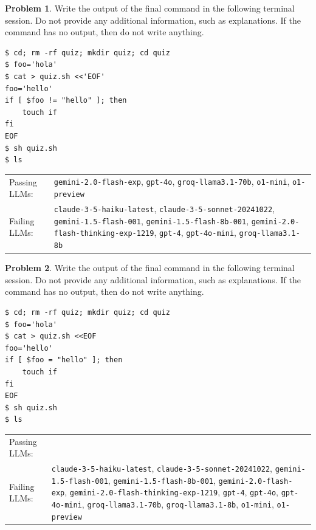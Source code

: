 \documentclass[10pt]{article}
\theoremstyle{definition}
\newtheorem{problem}{Problem}
\begin{document}
\noindent\vspace{0.1in}\begin{minipage}{\textwidth}

\begin{problem}
Write the output of the final command in the following terminal session.
Do not provide any additional information,
such as explanations.
If the command has no output,
then do not write anything.

\end{problem}
\begin{lstlisting}
$ cd; rm -rf quiz; mkdir quiz; cd quiz
$ foo='hola'
$ cat > quiz.sh <<'EOF'
foo='hello'
if [ $foo != "hello" ]; then
    touch if
fi
EOF
$ sh quiz.sh
$ ls
\end{lstlisting}


\noindent
\begin{tabular}{p{1.0in}L{5in}}
Passing LLMs: & {\lstinline$gemini-2.0-flash-exp$}, {\lstinline$gpt-4o$}, {\lstinline$groq-llama3.1-70b$}, {\lstinline$o1-mini$}, {\lstinline$o1-preview$} \\
Failing LLMs: & {\lstinline$claude-3-5-haiku-latest$}, {\lstinline$claude-3-5-sonnet-20241022$}, {\lstinline$gemini-1.5-flash-001$}, {\lstinline$gemini-1.5-flash-8b-001$}, {\lstinline$gemini-2.0-flash-thinking-exp-1219$}, {\lstinline$gpt-4$}, {\lstinline$gpt-4o-mini$}, {\lstinline$groq-llama3.1-8b$} \\
\end{tabular}

\end{minipage}
\noindent\vspace{0.1in}\begin{minipage}{\textwidth}

\begin{problem}
Write the output of the final command in the following terminal session.
Do not provide any additional information,
such as explanations.
If the command has no output,
then do not write anything.

\end{problem}
\begin{lstlisting}
$ cd; rm -rf quiz; mkdir quiz; cd quiz
$ foo='hola'
$ cat > quiz.sh <<EOF
foo='hello'
if [ $foo = "hello" ]; then
    touch if
fi
EOF
$ sh quiz.sh
$ ls
\end{lstlisting}


\noindent
\begin{tabular}{p{1.0in}L{5in}}
Passing LLMs: &  \\
Failing LLMs: & {\lstinline$claude-3-5-haiku-latest$}, {\lstinline$claude-3-5-sonnet-20241022$}, {\lstinline$gemini-1.5-flash-001$}, {\lstinline$gemini-1.5-flash-8b-001$}, {\lstinline$gemini-2.0-flash-exp$}, {\lstinline$gemini-2.0-flash-thinking-exp-1219$}, {\lstinline$gpt-4$}, {\lstinline$gpt-4o$}, {\lstinline$gpt-4o-mini$}, {\lstinline$groq-llama3.1-70b$}, {\lstinline$groq-llama3.1-8b$}, {\lstinline$o1-mini$}, {\lstinline$o1-preview$} \\
\end{tabular}

\end{minipage}
\end{document}
